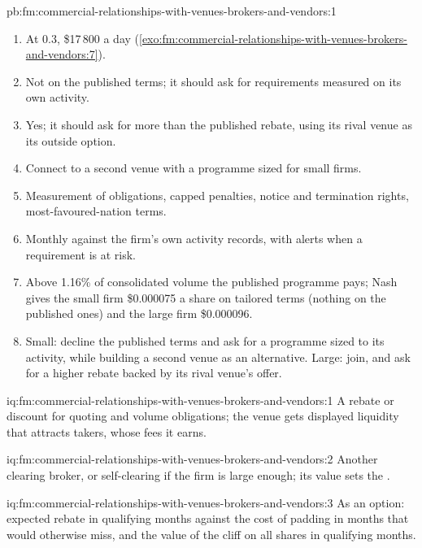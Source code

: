 \begin{solution}{pb:fm:commercial-relationships-with-venues-brokers-and-vendors:1}
\begin{enumerate}
\item At 0.3, \$17\,800 a day (\cref{exo:fm:commercial-relationships-with-venues-brokers-and-vendors:7}).
\item Not on the published terms; it should ask for requirements measured on its own activity.
\item Yes; it should ask for more than the published rebate, using its rival venue as its outside option.
\item Connect to a second venue with a programme sized for small firms.
\item Measurement of obligations, capped penalties, notice and termination rights, most-favoured-nation terms.
\item Monthly against the firm's own activity records, with alerts when a requirement is at risk.
\item Above 1.16\% of consolidated volume the published programme pays; Nash gives the small firm \$0.000075 a share on tailored terms (nothing on
the published ones) and the large firm \$0.000096.
\item Small: decline the published terms and ask for a programme sized to its activity, while building a second venue as an alternative. Large:
join, and ask for a higher rebate backed by its rival venue's offer.
\end{enumerate}
\end{solution}

\begin{solution}{iq:fm:commercial-relationships-with-venues-brokers-and-vendors:1}
A rebate or discount for quoting and volume obligations; the venue gets displayed liquidity that attracts takers, whose fees it earns.
\end{solution}

\begin{solution}{iq:fm:commercial-relationships-with-venues-brokers-and-vendors:2}
Another clearing broker, or self-clearing if the firm is large enough; its value sets the .
\end{solution}

\begin{solution}{iq:fm:commercial-relationships-with-venues-brokers-and-vendors:3}
As an option: expected rebate in qualifying months against the cost of padding in months that would otherwise miss, and the value of the cliff on
all shares in qualifying months.
\end{solution}

